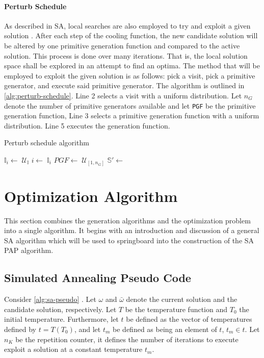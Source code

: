 \documentclass[11pt,a4paper,final]{article}
\newcommand{\Tau}{T}                        %
\newcommand{\I}{\mathbb{I}}                 %
\newcommand{\C}{\mathbb{C}}                 %
\newcommand{\U}{\mathcal{U}}                %
\newcommand{\Sol}{\mathbb{S}}               %
\begin{document}
\paragraph{Perturb Schedule}
\label{sec:tweak-schedule}
As described in SA, local searches are also employed to try and exploit a given solution
\cite{radosavljevic-2018-metah-optim}. After each step of the cooling function, the new candidate solution will be
altered by one primitive generation function and compared to the active solution. This process is done over many
iterations. That is, the local solution space shall be explored in an attempt to find an optima. The method that will be
employed to exploit the given solution is as follows: pick a visit, pick a primitive generator, and execute said
primitive generator. The algorithm is outlined in \ref{alg:perturb-schedule}. Line 2 selects a visit with a uniform
distribution. Let \(n_G\) denote the number of primitive generators available and let \texttt{PGF} be the primitive generation
function, Line 3 selects a primitive generation function with a uniform distribution. Line 5 executes the generation
function.

\begin{algorithm}[H]
\caption{Perturb schedule algorithm} \label{alg:perturb-schedule}

    \LinesNumbered
    \KwIn{$\I$, $\C$}
    \KwOut{$\I_i'$, $\C'$}


    \Begin
    {
        $\I_i\leftarrow\; \U_{\I}$
        $i \leftarrow\; \I_i$
        $PGF \leftarrow\; \U_{[1,n_G]}$
        $\Sol' \leftarrow$ \PGF{($i$, $\I$, $\C$)}
        \Return{($\I'$, $\C'$)}
    }
\end{algorithm}
\section{Optimization Algorithm}
\label{sec:optimization-algorithm}
This section combines the generation algorithms and the optimization problem into a single algorithm. It begins with an
introduction and discussion of a general SA algorithm which will be used to springboard into the construction of the SA
PAP algorithm.

\subsection{Simulated Annealing Pseudo Code}
\label{sec:simulated-annealing-pseudo-code}
Consider \ref{alg:sa-pseudo} \cite{henderson-1989-theor-pract}. Let \(\omega\) and \(\bar{\omega}\) denote the current solution and
the candidate solution, respectively. Let \(\Tau\) be the temperature function and \(\Tau_0\) the initial temperature.
Furthermore, let \(t\) be defined as the vector of temperatures defined by \(t = \Tau(\Tau_0)\), and let \(t_m\) be defined as
being an element of \(t\), \(t_m \in t\). Let \(n_K\) be the repetition counter, it defines the number of iterations to execute
exploit a solution at a constant temperature \(t_m\).
\end{document}
